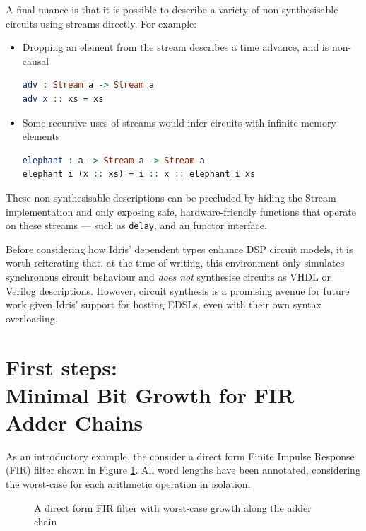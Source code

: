\documentclass[conference]{IEEEtran}
\begin{document}
A final nuance is that it is possible to describe a variety of non-synthesisable
circuits using streams directly. For example:

\begin{itemize}
\item Dropping an element from the stream describes a time advance, and is
  non-causal
\begin{lstlisting}[language=idris]
adv : Stream a -> Stream a
adv x :: xs = xs
\end{lstlisting}
      
\item Some recursive uses of streams would infer circuits with infinite memory
  elements\cite{baaij_15}
\begin{lstlisting}[language=idris]
elephant : a -> Stream a -> Stream a
elephant i (x :: xs) = i :: x :: elephant i xs
\end{lstlisting}
\end{itemize}

These non-synthesisable descriptions can be precluded by hiding the Stream
implementation and only exposing safe, hardware-friendly functions that operate
on these streams --- such as \texttt{delay}, and an functor interface.

Before considering how Idris' dependent types enhance DSP circuit models, it is
worth reiterating that, at the time of writing, this environment only simulates
synchronous circuit behaviour and \emph{does not} synthesise circuits as VHDL or
Verilog descriptions. However, circuit synthesis is a promising avenue for
future work given Idris' support for hosting EDSLs, even with their own syntax
overloading\cite{brady_12}.


\section{First steps:\\Minimal Bit Growth for FIR Adder Chains}
\label{sec:fir}

As an introductory example, the consider a direct form Finite Impulse Response
(FIR) filter shown in Figure \ref{fig:fir_direct}. All word lengths have been
annotated, considering the worst-case for each arithmetic operation in
isolation. 

\begin{figure}
  \centering
  
  \caption{A direct form FIR filter with worst-case growth along the adder chain}
  \label{fig:fir_direct}
\end{figure}
\end{document}
